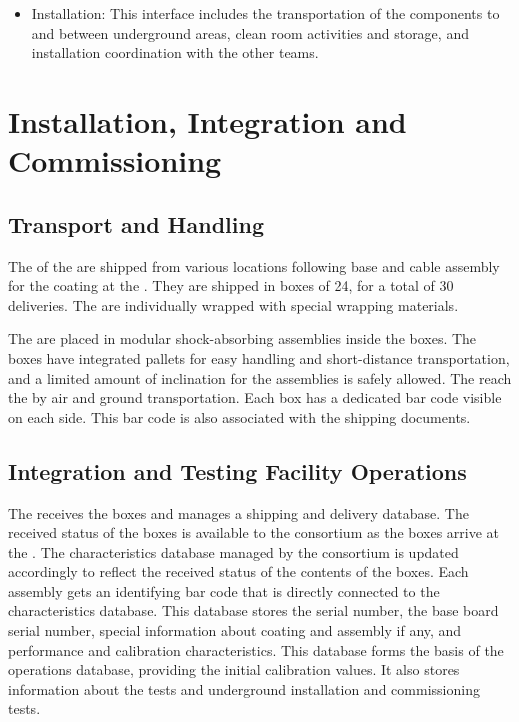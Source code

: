 \begin{itemize}
\item Installation: This interface %
includes the transportation of the  components to and between underground areas, clean room activities and storage, and installation coordination with the other teams. 

\end{itemize}

\section{Installation, Integration and Commissioning}
\label{sec:fddp-pd-9}

\subsection{Transport and Handling}
\label{sec:fddp-pd-9.1}

The \dpnumpmtch {} of the  are shipped from various locations following base and cable assembly for the  coating at the . %
They are shipped in boxes of \num{24}, for a total of \num{30} deliveries.
The  are individually wrapped with special wrapping materials. 

The  are placed in modular shock-absorbing assemblies inside the boxes. %
The boxes have integrated pallets for easy handling and short-distance transportation, and a limited amount of inclination for the assemblies is safely allowed. The  reach the  by air and ground transportation. Each box has a dedicated bar code  visible on each side. This bar code is also associated with the shipping documents. 

\subsection{Integration and Testing Facility Operations}
\label{sec:fddp-pd-9.2}

The  receives the  boxes and manages a shipping and delivery database. The received status of the boxes is available to the \dual {} consortium as the boxes arrive at the . The  characteristics database managed by the \dual {} consortium is updated accordingly to reflect the received status of the contents of the boxes. Each  assembly gets an identifying bar code that is directly connected to the  characteristics database. This database stores the  serial number, the base board serial number, special information about  coating and assembly if any, and performance and calibration characteristics. This database  forms the basis of the operations database, providing the initial calibration values. It also stores information about the  tests and underground installation and commissioning tests.

